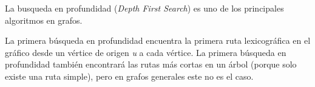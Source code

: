 La busqueda en profundidad (\emph{Depth First Search}) es uno de los principales algoritmos en grafos.

La primera búsqueda en profundidad encuentra la primera ruta lexicográfica en el gráfico desde un vértice de origen \emph{u} a cada vértice. La primera búsqueda en profundidad también encontrará las rutas más cortas en un árbol (porque solo existe una ruta simple), pero en grafos generales este no es el caso.